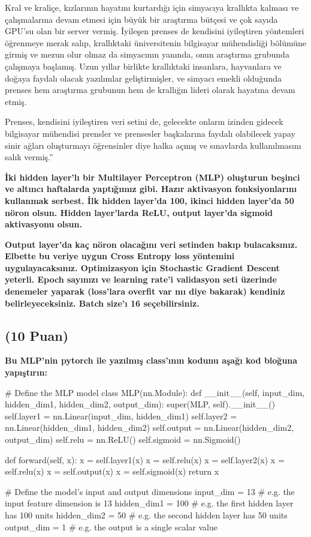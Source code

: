 \documentclass[11pt]{article}
\begin{document}
Kral ve kraliçe, kızlarının hayatını kurtardığı için simyacıya krallıkta kalması ve çalışmalarına devam etmesi için büyük bir araştırma bütçesi ve çok sayıda GPU'su olan bir server vermiş. İyileşen prenses de kendisini iyileştiren yöntemleri öğrenmeye merak salıp, krallıktaki üniversitenin bilgisayar mühendisliği bölümüne girmiş ve mezun olur olmaz da simyacının yanında, onun araştırma grubunda çalışmaya başlamış. Uzun yıllar birlikte krallıktaki insanlara, hayvanlara ve doğaya faydalı olacak yazılımlar geliştirmişler, ve simyacı emekli olduğunda prenses hem araştırma grubunun hem de krallığın lideri olarak hayatına devam etmiş.

Prenses, kendisini iyileştiren veri setini de, gelecekte onların izinden gidecek bilgisayar mühendisi prensler ve prensesler başkalarına faydalı olabilecek yapay sinir ağları oluşturmayı öğrensinler diye halka açmış ve sınavlarda kullanılmasını salık vermiş.''

\textbf{İki hidden layer'lı bir Multilayer Perceptron (MLP) oluşturun beşinci ve altıncı haftalarda yaptığımız gibi. Hazır aktivasyon fonksiyonlarını kullanmak serbest. İlk hidden layer'da 100, ikinci hidden layer'da 50 nöron olsun. Hidden layer'larda ReLU, output layer'da sigmoid aktivasyonu olsun.}

\textbf{Output layer'da kaç nöron olacağını veri setinden bakıp bulacaksınız. Elbette bu veriye uygun Cross Entropy loss yöntemini uygulayacaksınız. Optimizasyon için Stochastic Gradient Descent yeterli. Epoch sayınızı ve learning rate'i validasyon seti üzerinde denemeler yaparak (loss'lara overfit var mı diye bakarak) kendiniz belirleyeceksiniz. Batch size'ı 16 seçebilirsiniz.}

\subsection{(10 Puan)} \textbf{Bu MLP'nin pytorch ile yazılmış class'ının kodunu aşağı kod bloğuna yapıştırın:}

\begin{python}
# Define the MLP model
class MLP(nn.Module):
    def __init__(self, input_dim, hidden_dim1, hidden_dim2, output_dim):
        super(MLP, self).__init__()
        self.layer1 = nn.Linear(input_dim, hidden_dim1)
        self.layer2 = nn.Linear(hidden_dim1, hidden_dim2)
        self.output = nn.Linear(hidden_dim2, output_dim)
        self.relu = nn.ReLU()
        self.sigmoid = nn.Sigmoid()
        
    def forward(self, x):
        x = self.layer1(x)
        x = self.relu(x)
        x = self.layer2(x)
        x = self.relu(x)
        x = self.output(x)
        x = self.sigmoid(x)
        return x

# Define the model's input and output dimensions
input_dim = 13 # e.g. the input feature dimension is 13
hidden_dim1 = 100 # e.g. the first hidden layer has 100 units
hidden_dim2 = 50 # e.g. the second hidden layer has 50 units
output_dim = 1 # e.g. the output is a single scalar value
\end{python}
\end{document}
